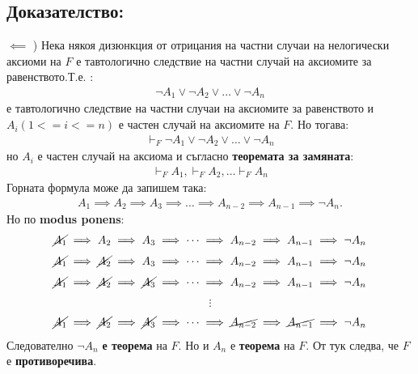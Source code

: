 \documentclass[french]{article}
\begin{document}
\subsection*{Доказателство:}
$\impliedby$ ) Нека някоя дизюнкция от отрицания на частни случаи на нелогически аксиоми на $F$ е тавтологично следствие на частни случай на аксиомите за равенството.Т.е. : 
\begin{align}
\neg A_1 \lor \neg A_2 \lor \dots \lor \neg A_n
\end{align}
е тавтологично следствие на частни случаи на аксиомите за равенството и $A_i (1 <= i <= n)$ е частен случай на аксиомите на $F$.
Но тогава:
\begin{align}
 \vdash_F \neg A_1 \lor \neg A_2 \lor \dots \lor \neg A_n
\end{align}
но $A_i$ е частен случай на аксиома и съгласно \textbf{теоремата за замяната}: 
\begin{align}
\vdash_F  A_1, \vdash_F A_2,  \dots \vdash_F  A_n
\end{align}
Горната формула може да запишем така:
\begin{align}
 A_1 \implies A_2 \implies A_3 \implies \dots \implies A_{n-2} \implies A_{n-1} \implies \neg A_n.
\end{align}
Но по \textbf{modus ponens}:  
\begin{align}
 \cancel{A_1} \implies A_2 \implies A_3 \implies \dots \implies A_{n-2} \implies A_{n-1} \implies \neg A_n 
\end{align} 
\begin{align*}
  \cancel{A_1} \implies \cancel{A_2} \implies A_3 \implies \dots \implies A_{n-2} \implies A_{n-1} \implies \neg A_n 
\end{align*}
\begin{align*}
\cancel{A_1} \implies \cancel{A_2} \implies \cancel{A_3} \implies \dots \implies A_{n-2} \implies A_{n-1} \implies \neg A_n 
\end{align*}
\begin{align*}
\vdots
\end{align*}
\begin{align*}
\cancel{A_1} \implies \cancel{A_2} \implies \cancel{A_3} \implies \dots \implies \cancel{A_{n-2}} \implies \cancel{A_{n-1}} \implies \neg A_n 
\end{align*}
Следователно $\neg A_n$ \textbf{е теорема} на $F$. Но и $A_n$ е \textbf{теорема} на $F$. \newline От тук следва, че $F$ е \textbf{противоречива}. \newline \newline
\end{document}
